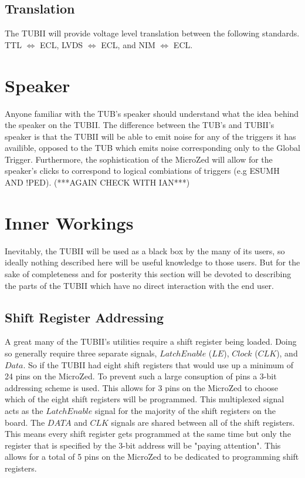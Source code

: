 \documentclass[11pt,a4paper]{article}
\begin{document}
\subsection{Translation}
The TUBII will provide voltage level translation between the following standards. TTL $\Longleftrightarrow$ ECL, LVDS $\Longleftrightarrow$ ECL, and NIM $\Longleftrightarrow$ ECL.
\section{Speaker}
Anyone familiar with the TUB's speaker should understand what the idea behind the  speaker on the TUBII. The difference between the TUB's and TUBII's speaker is that the TUBII will be able to emit noise for any of the triggers it has availible, opposed to the TUB which emits noise corresponding only to the Global Trigger. Furthermore, the sophistication of the MicroZed will allow for the speaker's clicks to correspond to logical combiations of triggers (e.g ESUMH AND !PED). (***AGAIN CHECK WITH IAN***)

\section{Inner Workings}
Inevitably, the TUBII will be used as a black box by the many of its users, so ideally nothing described here will be useful knowledge to those users. But for the sake of completeness and for posterity this section will be devoted to describing the parts of the TUBII which have no direct interaction with the end user.

\subsection{Shift Register Addressing}
A great many of the TUBII's utilities require a shift register being loaded. Doing so generally require three separate signals, $Latch Enable$ ($LE$), $Clock$ ($CLK$), and $Data$.
So if the TUBII had eight shift registers that would use up a minimum of 24 pins on the MicroZed. To prevent such a large consuption of pins a 3-bit addressing scheme is used. This allows for 3 pins on the MicroZed to choose which of the eight shift registers will be programmed. This multiplexed signal acts as the $LatchEnable$ signal for the majority of the shift registers on the board. The $DATA$ and $CLK$ signals are shared between all of the shift registers. This means every shift register gets programmed at the same time but only the register that is specified by the 3-bit address will be "paying attention". This allows for a total of 5 pins on the MicroZed to be dedicated to programming shift registers.
\end{document}
